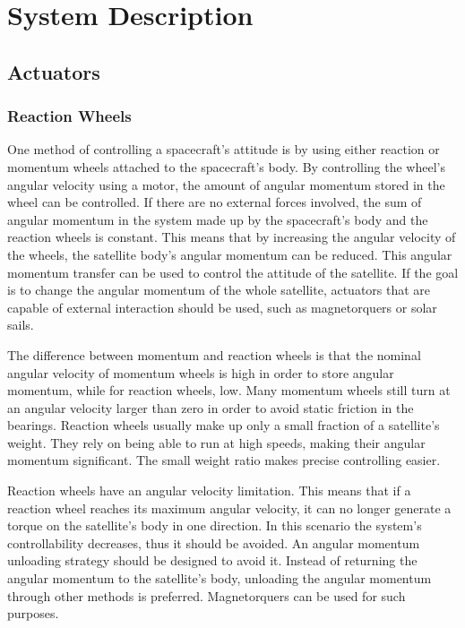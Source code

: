 \chapter{System Description}\label{chap:systemDescribtion}



\section{Actuators}
 
\subsection{Reaction Wheels}

One method of controlling a spacecraft's attitude is by using either reaction or momentum wheels attached to the spacecraft's body. By controlling the wheel's angular velocity using a motor, the amount of angular momentum stored in the wheel can be controlled. If there are no external forces involved, the sum of angular momentum in the system made up by the spacecraft's body and the reaction wheels is constant. This means that by increasing the angular velocity of the wheels, the satellite body's angular momentum can be reduced. This angular momentum transfer can be used to control the attitude of the satellite. If the goal is to change the angular momentum of the whole satellite, actuators that are capable of external interaction should be used, such as magnetorquers or solar sails.

The difference between momentum and reaction wheels is that the nominal angular velocity of momentum wheels is high in order to store angular momentum, while for reaction wheels, low. Many momentum wheels still turn at an angular velocity larger than zero in order to avoid static friction in the bearings. Reaction wheels usually make up only a small fraction of a satellite's weight. They rely on being able to run at high speeds, making their angular momentum significant. The small weight ratio makes precise controlling easier.




Reaction wheels have an angular velocity limitation. This means that if a reaction wheel reaches its maximum angular velocity, it can no longer generate a torque on the satellite's body in one direction. In this scenario the system's controllability decreases, thus it should be avoided. An angular momentum unloading strategy should be designed to avoid it. Instead of returning the angular momentum to the satellite's body, unloading the angular momentum through other methods is preferred. Magnetorquers can be used for such purposes.


